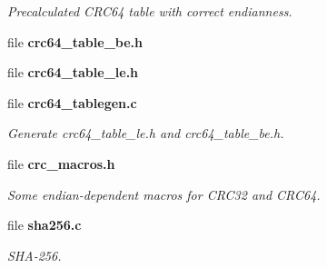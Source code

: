 \begin{DoxyCompactItemize}
\begin{DoxyCompactList}\small\item\em Precalculated C\-R\-C64 table with correct endianness. \end{DoxyCompactList}\item 
file {\bfseries crc64\-\_\-table\-\_\-be.\-h}
\item 
file {\bfseries crc64\-\_\-table\-\_\-le.\-h}
\item 
file {\bf crc64\-\_\-tablegen.\-c}
\begin{DoxyCompactList}\small\item\em Generate crc64\-\_\-table\-\_\-le.\-h and crc64\-\_\-table\-\_\-be.\-h. \end{DoxyCompactList}\item 
file {\bf crc\-\_\-macros.\-h}
\begin{DoxyCompactList}\small\item\em Some endian-\/dependent macros for C\-R\-C32 and C\-R\-C64. \end{DoxyCompactList}\item 
file {\bf sha256.\-c}
\begin{DoxyCompactList}\small\item\em S\-H\-A-\/256. \end{DoxyCompactList}\end{DoxyCompactItemize}
